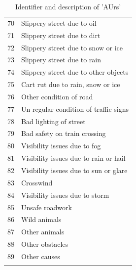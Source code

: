 \documentclass[a4paper,headsepline,footsepline,fontsize=11pt,BCOR=12mm,DIV=12]{report}
\begin{document}
\noindent
\begingroup
	\centering
	\begin{longtable}{c|l}  
	70 & Slippery street due to oil \\
	71 & Slippery street due to dirt \\
	72 & Slippery street due to snow or ice \\
	73 & Slippery street due to rain \\
	74 & Slippery street due to other objects \\
	75 & Cart rut due to rain, snow or ice \\
	76 & Other condition of road \\
	77 & Un regular condition of traffic signs \\
	78 & Bad lighting of street \\
	79 & Bad safety on train crossing \\
	80 & Visibility issues due to fog \\
	81 & Visibility issues due to rain or hail \\
	82 & Visibility issues due to sun or glare \\
	83 & Crosswind \\
	84 & Visibility issues due to storm \\
	85 & Unsafe roadwork \\
	86 & Wild animals \\
	87 & Other animals \\
	88 & Other obstacles \\
	89 & Other causes \\
	\caption{Identifier and description of 'AUrs'} \\
	\end{longtable}
	\label{table:baysis_dataset_AUrs}
\endgroup
\end{document}
